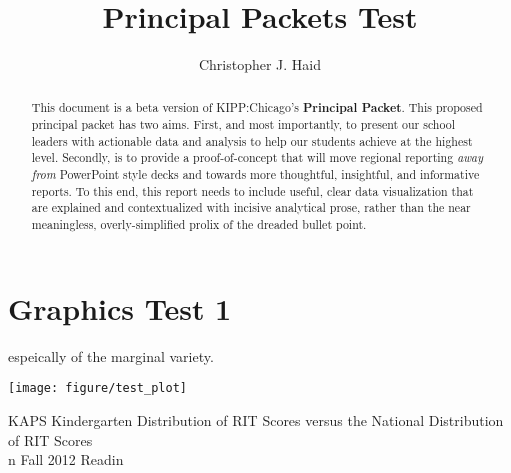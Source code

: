 \documentclass[sfsidenotes, justified]{tufte-handout}\usepackage{graphicx, color}
\title{Principal Packets Test}
\author{Christopher J. Haid}
\newenvironment{knitrout}{}{} %
\begin{document}
\maketitle
\begin{abstract}
This document is a beta version of KIPP:Chicago's \textbf{Principal Packet}.  This proposed principal packet has two aims.  First, and most importantly, to present our school leaders with actionable data and analysis to help our students achieve at the highest level.  Secondly, is to provide a proof-of-concept that will move regional reporting \emph{away from} PowerPoint style decks and towards more thoughtful, insightful, and informative reports.  To this end, this report needs to include useful, clear data visualization that are explained and contextualized with incisive analytical prose, rather than the near meaningless, overly-simplified prolix of the dreaded bullet point.
\end{abstract}



















\section{Graphics Test 1}

 espeically of the marginal variety. 
\blindtext
\blindtext
\begin{marginfigure}
\begin{knitrout}
\color{fgcolor}

{\centering \texttt{[image: figure/test\_plot]} 

}


\end{knitrout}

\caption{KAPS Kindergarten Distribution of RIT Scores versus the National Distribution of RIT Scores \\n Fall 2012 Readin}
\end{marginfigure}
\blindtext
\blindtext
\end{document}
